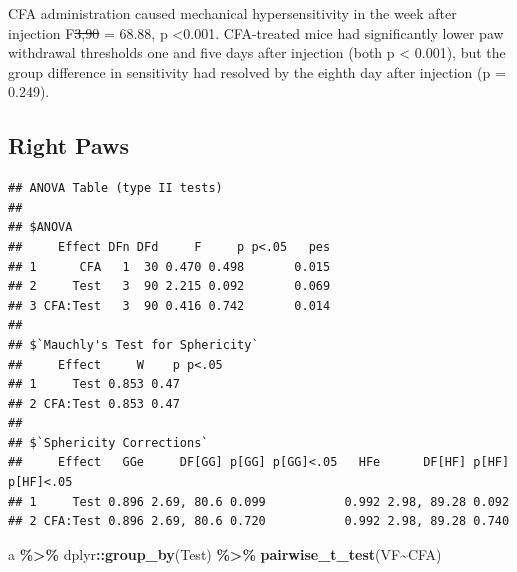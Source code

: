 \documentclass[
]{book}
\newenvironment{Shaded}{\begin{snugshade}}{\end{snugshade}}
\newcommand{\AttributeTok}[1]{\textcolor[rgb]{0.13,0.29,0.53}{#1}}
\newcommand{\FunctionTok}[1]{\textcolor[rgb]{0.13,0.29,0.53}{\textbf{#1}}}
\newcommand{\NormalTok}[1]{#1}
\newcommand{\OtherTok}[1]{\textcolor[rgb]{0.56,0.35,0.01}{#1}}
\newcommand{\SpecialCharTok}[1]{\textcolor[rgb]{0.81,0.36,0.00}{\textbf{#1}}}
\newcommand{\StringTok}[1]{\textcolor[rgb]{0.31,0.60,0.02}{#1}}
\begin{document}
CFA administration caused mechanical hypersensitivity in the week after injection F\st{3,90} = 68.88, p \textless0.001. CFA-treated mice had significantly lower paw withdrawal thresholds one and five days after injection (both p \textless{} 0.001), but the group difference in sensitivity had resolved by the eighth day after injection (p = 0.249).

\subsection*{Right Paws}\label{right-paws-1}

\begin{Shaded}
\end{Shaded}

\begin{verbatim}
## ANOVA Table (type II tests)
## 
## $ANOVA
##     Effect DFn DFd     F     p p<.05   pes
## 1      CFA   1  30 0.470 0.498       0.015
## 2     Test   3  90 2.215 0.092       0.069
## 3 CFA:Test   3  90 0.416 0.742       0.014
## 
## $`Mauchly's Test for Sphericity`
##     Effect     W    p p<.05
## 1     Test 0.853 0.47      
## 2 CFA:Test 0.853 0.47      
## 
## $`Sphericity Corrections`
##     Effect   GGe     DF[GG] p[GG] p[GG]<.05   HFe      DF[HF] p[HF] p[HF]<.05
## 1     Test 0.896 2.69, 80.6 0.099           0.992 2.98, 89.28 0.092          
## 2 CFA:Test 0.896 2.69, 80.6 0.720           0.992 2.98, 89.28 0.740
\end{verbatim}

\begin{Shaded}
\begin{Highlighting}[]
\NormalTok{a }\SpecialCharTok{\%\textgreater{}\%}
\NormalTok{  dplyr}\SpecialCharTok{::}\FunctionTok{group\_by}\NormalTok{(Test) }\SpecialCharTok{\%\textgreater{}\%}
  \FunctionTok{pairwise\_t\_test}\NormalTok{(VF}\SpecialCharTok{\textasciitilde{}}\NormalTok{CFA)}
\end{Highlighting}
\end{Shaded}
\end{document}
